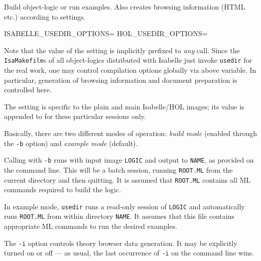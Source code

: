 \begin{isabellebody}
\begin{isamarkuptext}
\begin{ttbox}
  Build object-logic or run examples. Also creates browsing
  information (HTML etc.) according to settings.

  ISABELLE_USEDIR_OPTIONS=
  HOL_USEDIR_OPTIONS=
\end{ttbox}

  Note that the value of the \hyperlink{setting.ISABELLE-USEDIR-OPTIONS}{\mbox{}}
  setting is implicitly prefixed to \emph{any} \hyperlink{tool.usedir}{\mbox{}}
  call. Since the \verb|IsaMakefile|s of all object-logics
  distributed with Isabelle just invoke \texttt{usedir} for the real
  work, one may control compilation options globally via above
  variable. In particular, generation of  browsing
  information and document preparation is controlled here.

  The \hyperlink{setting.HOL-USEDIR-OPTIONS}{\mbox{}} setting is specific to the
  plain and main Isabelle/HOL images; its value is appended to
  \hyperlink{setting.ISABELLE-USEDIR-OPTIONS}{\mbox{}} for these particular sessions
  only.%
\end{isamarkuptext}%
\isamarkuptrue%
%
\isamarkuptrue%
%
\begin{isamarkuptext}%
Basically, there are two different modes of operation: \emph{build
  mode} (enabled through the \verb|-b| option) and
  \emph{example mode} (default).

  Calling \hyperlink{tool.usedir}{\mbox{}} with \verb|-b| runs \hyperlink{executable.isabelle-process}{\mbox{}} with input image \verb|LOGIC| and output to
  \verb|NAME|, as provided on the command line. This will be a
  batch session, running \verb|ROOT.ML| from the current
  directory and then quitting.  It is assumed that \verb|ROOT.ML|
  contains all ML commands required to build the logic.

  In example mode, \verb|usedir| runs a read-only session of
  \verb|LOGIC| and automatically runs \verb|ROOT.ML| from
  within directory \verb|NAME|.  It assumes that this file
  contains appropriate ML commands to run the desired examples.

  \medskip The \verb|-i| option controls theory browser data
  generation. It may be explicitly turned on or off --- as usual, the
  last occurrence of \verb|-i| on the command line wins.


\end{isamarkuptext}
\end{isabellebody}
